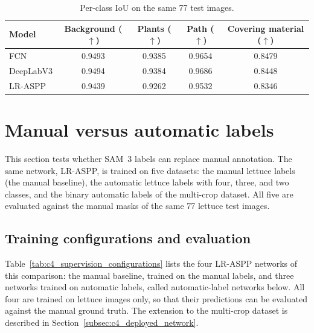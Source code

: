 \begin{table}[htb]
    \centering
    \small
    \caption{Per-class IoU on the same 77 test images.}
    \label{tab:c4_architecture_class_iou}
    \begin{tabular}{@{}l S[table-format=1.4] S[table-format=1.4] S[table-format=1.4] S[table-format=1.4]@{}}
        \toprule
        Model & {Background ($\uparrow$)} & {Plants ($\uparrow$)} & {Path ($\uparrow$)} & {Covering material ($\uparrow$)} \\
        \midrule
        FCN & 0.9493 & 0.9385 & 0.9654 & 0.8479 \\
        DeepLabV3 & 0.9494 & 0.9384 & 0.9686 & 0.8448 \\
        LR-ASPP & 0.9439 & 0.9262 & 0.9532 & 0.8346 \\
        \bottomrule
    \end{tabular}
\end{table}

\section{Manual versus automatic labels}
\label{sec:c4_supervision_comparison}

This section tests whether SAM~3 labels can replace manual annotation. The same network, LR-ASPP, is trained on five datasets: the manual lettuce labels (the manual baseline), the automatic lettuce labels with four, three, and two classes, and the binary automatic labels of the multi-crop dataset. All five are evaluated against the manual masks of the same 77 lettuce test images.

\subsection{Training configurations and evaluation}
\label{subsec:c4_supervision_configurations}

Table~\ref{tab:c4_supervision_configurations} lists the four LR-ASPP networks of this comparison: the manual baseline, trained on the manual labels, and three networks trained on automatic labels, called automatic-label networks below. All four are trained on lettuce images only, so that their predictions can be evaluated against the manual ground truth. The extension to the multi-crop dataset is described in Section~\ref{subsec:c4_deployed_network}.


